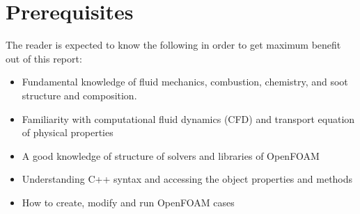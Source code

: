 \chapter*{Prerequisites}

The reader is expected to know the following in order to get maximum benefit out of this report:
\begin{itemize}
	
	\item Fundamental knowledge of fluid mechanics, combustion, chemistry, and soot structure and composition.
	\item Familiarity with computational fluid dynamics (CFD) and transport equation of physical properties
	\item A good knowledge of structure of solvers and libraries of OpenFOAM
	\item Understanding C++ syntax and accessing the object properties and methods
	\item How to create, modify and run OpenFOAM cases
\end{itemize}